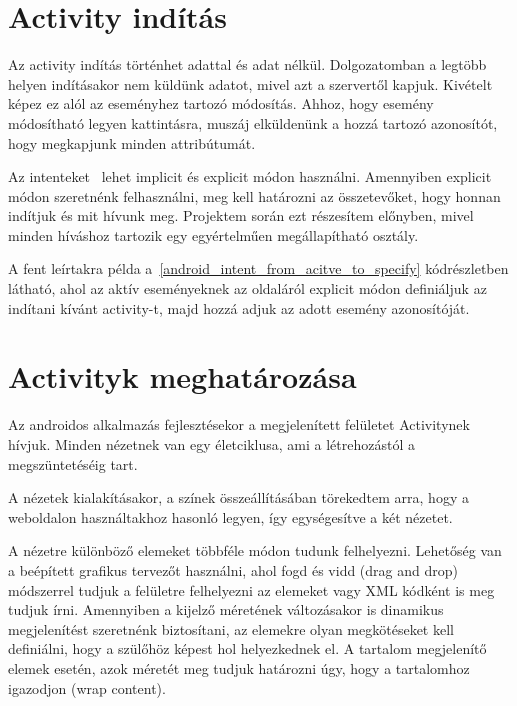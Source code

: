 \documentclass[
]{thesis-ekf}
\theoremstyle{definition}
\theoremstyle{remark}
\begin{document}
	\section{Activity indítás}
	Az activity indítás történhet adattal és adat nélkül. Dolgozatomban a legtöbb helyen indításakor nem küldünk adatot, mivel azt a szervertől kapjuk. Kivételt képez ez alól az eseményhez tartozó módosítás. Ahhoz, hogy esemény módosítható legyen kattintásra, muszáj elküldenünk a hozzá tartozó azonosítót, hogy megkapjunk minden attribútumát.
	
	Az intenteket~\cite{android_intent} lehet implicit és explicit módon használni. Amennyiben explicit módon szeretnénk felhasználni, meg kell határozni az összetevőket, hogy honnan indítjuk és mit hívunk meg. Projektem során ezt részesítem előnyben, mivel minden híváshoz tartozik egy egyértelműen megállapítható osztály.
	
	A fent leírtakra példa a~\ref{android_intent_from_acitve_to_specify} kódrészletben látható, ahol az aktív eseményeknek az oldaláról explicit módon definiáljuk az indítani kívánt activity-t, majd hozzá adjuk az adott esemény azonosítóját.
	
	
	
	\section{Activityk meghatározása}
	Az androidos alkalmazás fejlesztésekor a megjelenített felületet Activitynek hívjuk. Minden nézetnek van egy életciklusa, ami a létrehozástól a megszüntetéséig tart.
	
	A nézetek kialakításakor, a színek összeállításában törekedtem arra, hogy a weboldalon használtakhoz hasonló legyen, így egységesítve a két nézetet. 
	
	A nézetre különböző elemeket többféle módon tudunk felhelyezni. Lehetőség van a beépített grafikus tervezőt használni, ahol fogd és vidd (drag and drop) módszerrel tudjuk a felületre felhelyezni az elemeket vagy XML kódként is meg tudjuk írni. Amennyiben a kijelző méretének változásakor is dinamikus megjelenítést szeretnénk biztosítani, az elemekre olyan megkötéseket kell definiálni, hogy a szülőhöz képest hol helyezkednek el. A tartalom megjelenítő elemek esetén, azok méretét meg tudjuk határozni úgy, hogy a tartalomhoz igazodjon (wrap content).
	
\end{document}
